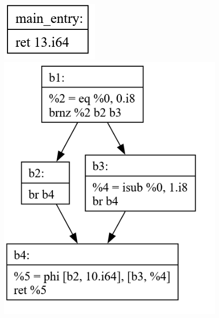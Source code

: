 \documentclass[11pt, a4paper, titlepage]{article}
\begin{document}
\begin{figure}[H]
  \centering
  \includegraphics[scale=0.3]{images/i45.png}
  \includegraphics[scale=0.3]{images/i46.png}

\end{figure}
\end{document}
